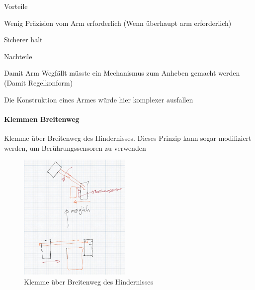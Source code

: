 \begin{minipage}[t]{0.48\textwidth}
    \begin{items}
          \item [Vorteile]
          \item Wenig Präzision vom Arm erforderlich (Wenn überhaupt arm erforderlich)
          \item Sicherer halt
    \end{items}
\end{minipage}
\hfill
\begin{minipage}[t]{0.48\textwidth}
    \begin{items}
          \item [Nachteile]
          \item Damit Arm Wegfällt müsste ein Mechanismus zum Anheben gemacht werden (Damit Regelkonform)
          \item Die Konstruktion eines Armes würde hier komplexer ausfallen 
    \end{items}
\end{minipage}
\paragraph{Klemmen Breitenweg}
Klemme über Breitenweg des Hindernisses. Dieses Prinzip kann sogar modifiziert
werden, um Berührungssensoren zu verwenden
\begin{figure}[h]
        \centering
        \includegraphics[width=0.48\textwidth]{img/technologierecherche/Aufnahme/Breiterweg_Griff.jpg}
        \caption{Klemme über Breitenweg des Hindernisses}
        \label{img:tech_Breiterweg_Griff}
\end{figure}

